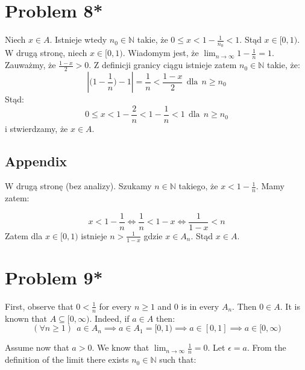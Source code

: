 \documentclass{article}
\begin{document}

\section*{Problem 8*}

Niech \(x \in A\). Istnieje wtedy \(n_0 \in \mathbb{N}\) takie, że \(0 \leq x < 1 - \frac{1}{n_0} < 1\). Stąd \(x \in [0, 1)\).
W drugą stronę, niech \(x \in [0, 1)\). Wiadomym jest, że \(\lim_{n \to \infty} 1 - \frac{1}{n} = 1\). Zauważmy, że
\( \frac{1 - x}{2} > 0 \). Z definicji granicy ciągu istnieje zatem \(n_0 \in \mathbb{N}\) takie, że:
\begin{equation*}
    |\big(1 - \frac{1}{n}\big) - 1| = \frac{1}{n} < \frac{1 - x}{2} \ \ \mbox{dla} \ \ n \geq n_0
\end{equation*}
Stąd:
\begin{equation*}
    0 \leq x < 1 - \frac{2}{n} < 1 - \frac{1}{n} < 1 \ \ \mbox{dla} \ \ n \geq n_0
\end{equation*}
i stwierdzamy, że \(x \in A\).
\subsection*{Appendix}
W drugą stronę (bez analizy). Szukamy \(n \in \mathbb{N}\) takiego, że \(x < 1 - \frac{1}{n}\). Mamy zatem:

\begin{equation*}
    x < 1 - \frac{1}{n} \iff \frac{1}{n}  < 1 - x \iff \frac{1}{1 - x} < n 
\end{equation*}
Zatem dla \(x \in [0, 1)\) istnieje \(n > \frac{1}{1 - x}\) gdzie \(x \in A_{n}\). Stąd \(x \in A\).

\section*{Problem 9*}

First, observe that \( 0 < \frac{1}{n} \) for every \(n \geq 1\) and \(0\) is in every \(A_n\). Then \( 0 \in A \).
\newline
It is known that \(A \subseteq [0, \infty)\). Indeed, if \(a \in A\) then:
\begin{equation*}
    (\forall n \geq 1) \ \ a \in A_{n} \implies a \in A_{1} = [0, 1) \implies a \in [0, 1] \implies a \in [0, \infty)
\end{equation*}

Assume now that \(a > 0\). We know that \(\lim_{n \to \infty} \frac{1}{n} = 0\).
Let \(\epsilon = a\).  From the definition of the limit there exists \(n_0 \in \mathbb{N}\) such that:
\end{document}
